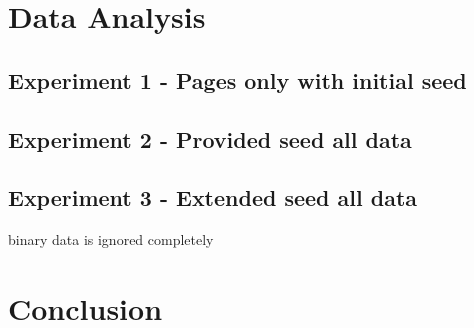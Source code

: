 \documentclass{article}
\begin{document}
\section{Data Analysis}

\subsection{Experiment 1 - Pages only with initial seed}
\subsection{Experiment 2 - Provided seed all data}
\subsection{Experiment 3 - Extended seed all data}
binary data is ignored completely
\section{Conclusion}




\end{document}
